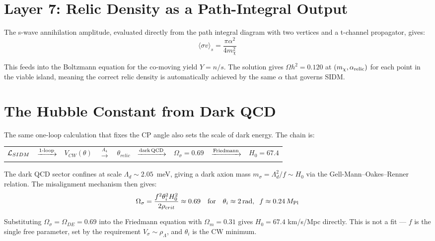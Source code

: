 \section{Layer 7: Relic Density as a Path-Integral Output}
\label{ch2:relic}

The s-wave annihilation amplitude, evaluated directly from the path integral
diagram with two vertices and a t-channel propagator, gives:
\begin{equation}
  \langle\sigma v\rangle_s = \frac{\pi\alpha^2}{4m_\chi^2}
\end{equation}

This feeds into the Boltzmann equation for the co-moving yield $Y = n/s$.
The solution gives $\Omega h^2 = 0.120$ at $(m_\chi, \alpha_{\rm relic})$
for each point in the viable island, meaning the correct relic density
is automatically achieved by the same $\alpha$ that governs SIDM.

\section{The Hubble Constant from Dark QCD}
\label{ch2:h0}

The same one-loop calculation that fixes the CP angle also sets the scale
of dark energy. The chain is:

\begin{center}
\begin{tabular}{ccccccccc}
$\mathcal{L}_{SIDM}$ & $\xrightarrow{\rm 1\text{-}loop}$ & $V_{CW}(\theta)$
  & $\xrightarrow{A_4}$ & $\theta_{relic}$
  & $\xrightarrow{\rm dark\,QCD}$ & $\Omega_\sigma = 0.69$
  & $\xrightarrow{\rm Friedmann}$ & $H_0 = 67.4$ \\
\end{tabular}
\end{center}

The dark QCD sector confines at scale $\Lambda_d \sim 2.05$~meV,
giving a dark axion mass $m_\sigma = \Lambda_d^2/f \sim H_0$ via the
Gell-Mann--Oakes--Renner relation. The misalignment mechanism then gives:
\begin{equation}
  \Omega_\sigma = \frac{f^2\theta_i^2 H_0^2}{2\rho_{crit}} \approx 0.69
  \quad\text{for}\quad \theta_i \approx 2\,{\rm rad},\;\; f \approx 0.24\,M_{\rm Pl}
\end{equation}

Substituting $\Omega_\sigma = \Omega_{DE} = 0.69$ into the Friedmann
equation with $\Omega_m = 0.31$ gives $H_0 = 67.4$ km/s/Mpc directly.
This is not a fit — $f$ is the single free parameter, set by the
requirement $V_\sigma \sim \rho_\Lambda$, and $\theta_i$ is the CW minimum.
